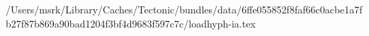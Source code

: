 /Users/msrk/Library/Caches/Tectonic/bundles/data/6ffe055852f8faf66c0acbe1a7fb27f87b869a90bad1204f3bf4d9683f597c7c/loadhyph-ia.tex